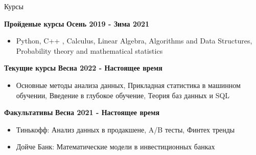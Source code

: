 \documentclass{resume} %
\begin{document}
\begin{rSection}{Курсы}

{\bf Пройденые курсы}  \hfill {\bf Осень 2019 - Зима 2021} 
\begin{itemize}
\item Python, C++ , Calculus, Linear Algebra, Algorithms and Data Structures, Probability theory and
mathematical statistics
\end{itemize}
{\bf Текущие курсы}  \hfill {\bf Весна 2022 - Настоящее время} 
\begin{itemize}
\item Основные методы анализа данных, Прикладная статистика в машинном обучении, Введение в глубокое обучение, Теория баз данных и SQL
\end{itemize}
{\bf Факультативы}  \hfill {\bf Весна 2021 - Настоящее время} 
\begin{itemize}
\item Тинькофф: Анализ данных в продакшене, A/B тесты, Финтех тренды
\item Дойче Банк: Математические модели в инвестиционных банках
\end{itemize}
\end{rSection}
\end{document}
